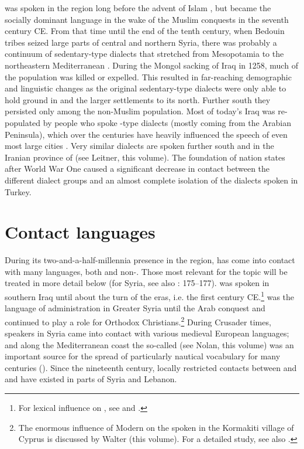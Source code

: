 \documentclass[output=paper]{langsci/langscibook}
\begin{document}
 was spoken in the region long before the advent of Islam \citep[95]{Donner1981}, but became the socially dominant language in the wake of the Muslim conquests in the seventh century CE. From that time until the end of the tenth century, when Bedouin tribes seized large parts of central and northern Syria, there was probably a continuum of sedentary-type dialects that stretched from Mesopotamia to the northeastern Mediterranean \citep[291]{Procházka2018Fertile}. During the Mongol sacking of Iraq in 1258, much of the population was killed or expelled. This resulted in far-reaching demographic and linguistic changes as the original sedentary-type dialects were only able to hold ground in  and the larger settlements to its north. Further south they persisted only among the non-Muslim population. Most of today’s Iraq was re-populated by people who spoke -type dialects (mostly coming from the Arabian Peninsula), which over the centuries have heavily influenced the speech of even most large cities \citep{Holes2007}. Very similar dialects are spoken further south and in the Iranian province of  (see Leitner, this volume). The foundation of nation states after World War One caused a significant decrease in contact between the different dialect groups and an almost complete isolation of the  dialects spoken in Turkey.

\section{Contact languages} 

During its two-and-a-half-millennia presence in the region,  has come into contact with many languages, both  and non-. Those most relevant for the topic will be treated in more detail below (for Syria, see also \citealt{Barbot1961}: 175--177).  was spoken in southern Iraq until about the turn of the eras, i.e. the first century CE.\footnote{For  lexical influence on , see \citet{Holes2002} and \citet{Krebernik2008}.}  was the language of administration in Greater Syria until the Arab conquest \citep[185--187]{Magidow2013} and continued to play a role for Orthodox {Christians}.\footnote{The enormous influence of Modern  on the  spoken in the {Kormakiti} village of {Cyprus} is discussed by Walter (this volume). For a detailed study, see also \citet{Borg1985}.} During Crusader times,  speakers in Syria came into contact with various medieval European languages; and along the Mediterranean coast the so-called  (see Nolan, this volume) was an important source for the spread of particularly nautical vocabulary for many centuries (\citealt{KahaneKahaneTietze1958}). Since the nineteenth century, locally restricted contacts between  and  and  have existed in parts of Syria and Lebanon. 
\end{document}
